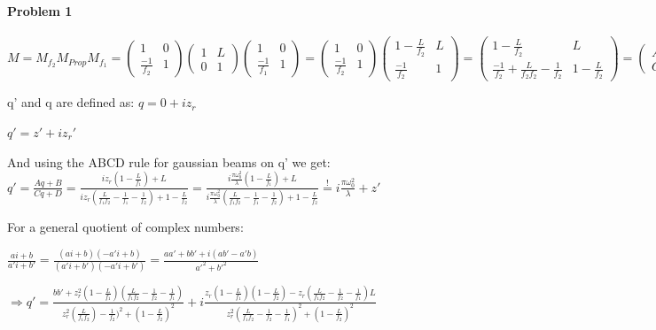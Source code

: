 \documentclass{article}
\newcommand{\mbeq}{\overset{!}{=}}
\begin{document}
\paragraph{Problem 1}
 $M = M_{f_2}M_{Prop}M_{f_1}=\begin{pmatrix}1 & 0\\ \frac{-1}{f_2} & 1
\end{pmatrix}\begin{pmatrix}1 & L\\ 0 & 1
\end{pmatrix}\begin{pmatrix}1 & 0\\ \frac{-1}{f_1} & 1
\end{pmatrix} =\begin{pmatrix}1 & 0\\ \frac{-1}{f_2} & 1
\end{pmatrix}\begin{pmatrix} 1-\frac{L}{f_2} & L\\ \frac{-1}{f_2} & 1
\end{pmatrix} = \begin{pmatrix} 1-\frac{L}{f_2} & L\\ \frac{-1}{f_2}+\frac{L}{f_2 f_2}-\frac{1}{f_2} & 1-\frac{L}{f_2}
\end{pmatrix}
 = \begin{pmatrix} A&B\\C&D\end{pmatrix}$

\setlength{\parskip}{2em}

q' and q are defined as:
$
q=0+iz_r$\par$
{q}'={z}'+i{z_r}'
$

And using the ABCD rule for gaussian beams on q' we get: 
${q}'=\frac{Aq+B}{Cq+D}=\frac{iz_r(1-\frac{L}{f_1})+L}{iz_r(\frac{L}{f_1 f_2}-\frac{1}{f_1}-\frac{1}{f_2})+1-\frac{L}{f_2}}=\frac{i\frac{\pi\omega_0^2}{\lambda}(1-\frac{L}{f_1})+L}{i\frac{\pi\omega_0^2}{\lambda}(\frac{L}{f_1 f_2}-\frac{1}{f_1}-\frac{1}{f_2})+1-\frac{L}{f_2}}\mbeq i\frac{\pi\omega_0^2}{\lambda}+{z}'$ 


For a general quotient of complex numbers:

$\frac{ai+b}{{a}'i+{b}'}=\frac{(ai+b)(-{a}'i+b)}{({a}'i+{b}')(-{a}'i+{b}')}=\frac{a{a}'+b{b}'+i(a{b}'-{a}'b)}{{a}'^2+{b}'^2}
$

$\Rightarrow{} {q}' = \frac{b{b}'+z_r^2(1-\frac{L}{f_1})(\frac{L}{f_1 f_2}-\frac{1}{f_2}-\frac{1}{f_1})}{z_r^2(\frac{L}{f_1 f_2})-\frac{1}{f_2})^2+(1-\frac{L}{f_2})^2}+i\frac{z_r(1-\frac{L}{f_1})(1-\frac{L}{f_2})-z_r(\frac{L}{f_1 f_2}-\frac{1}{f_2}-\frac{1}{f_1})L}{z_r^2(\frac{L}{f_1 f_2}-\frac{1}{f_2}-\frac{1}{f_1})^2+(1-\frac{L}{f_2})^2}
$
\end{document}
